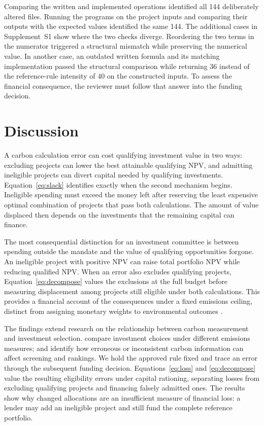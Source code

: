 Comparing the written and implemented operations identified all 144 deliberately altered files. Running the programs on the project inputs and comparing their outputs with the expected values identified the same 144. The additional cases in Supplement~S1 show where the two checks diverge. Reordering the two terms in the numerator triggered a structural mismatch while preserving the numerical value. In another case, an outdated written formula and its matching implementation passed the structural comparison while returning 36 instead of the reference-rule intensity of 40 on the constructed inputs. To assess the financial consequence, the reviewer must follow that answer into the funding decision.

\section{Discussion}
A carbon calculation error can cost qualifying investment value in two ways: excluding projects can lower the best attainable qualifying NPV, and admitting ineligible projects can divert capital needed by qualifying investments. Equation~\eqref{eq:slack} identifies exactly when the second mechanism begins. Ineligible spending must exceed the money left after reserving the least expensive optimal combination of projects that pass both calculations. The amount of value displaced then depends on the investments that the remaining capital can finance.

The most consequential distinction for an investment committee is between spending outside the mandate and the value of qualifying opportunities forgone. An ineligible project with positive NPV can raise total portfolio NPV while reducing qualified NPV. When an error also excludes qualifying projects, Equation~\eqref{eq:decompose} values the exclusions at the full budget before measuring displacement among projects still eligible under both calculations. This provides a financial account of the consequences under a fixed emissions ceiling, distinct from assigning monetary weights to environmental outcomes \citep{schoenmaker}.

The findings extend research on the relationship between carbon measurement and investment selection. \citet{anquetin} compare investment choices under different emissions measures; \citet{gurvich2021} and \citet{bajic2023} identify how erroneous or inconsistent carbon information can affect screening and rankings. We hold the approved rule fixed and trace an error through the subsequent funding decision. Equations~\eqref{eq:loss} and \eqref{eq:decompose} value the resulting eligibility errors under capital rationing, separating losses from excluding qualifying projects and financing falsely admitted ones. The results show why changed allocations are an insufficient measure of financial loss: a lender may add an ineligible project and still fund the complete reference portfolio.

